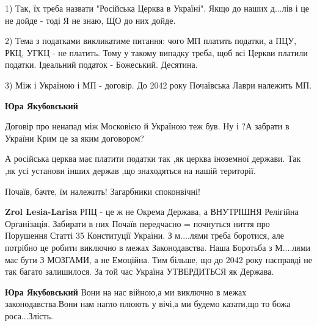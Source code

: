 \begin{itemize}
\begin{itemize}
1) Так, їх треба назвати "Російська Церква в Україні". Якщо до наших д...лів і
це не дойде - тоді Я не знаю, ЩО до них дойде.

2) Тема з податками викликатиме питання: чого МП платить податки, а ПЦУ, РКЦ,
УГКЦ - не платить. Тому у такому випадку треба, щоб всі Церкви платили податки.
Ідеальний податок - Божеський. Десятина.

3) Між і Україною і МП - договір. До 2042 року Почаївська Лаври належить МП.

 
\textbf{Юра Якубовський} 

Договір про ненапад між Московією й Україною теж був. Ну і ?А забрати в України
Крим це за яким договором?

А російська церква має платити податки так ,як церква іноземної держави. Так ,як
усі установи інших держав ,що знаходяться на нашій території.

Почаїв, бачте, їм належить! Загарбники споконвічні!

 
\textbf{Zrol Lesia-Larisa} РПЦ - це ж не Окрема Держава, а ВНУТРІШНЯ Релігійна
Організація. Забирати в них Почаїв передчасно = почнуться ниття про Порушення
Статті 35 Конституції України. З м....лями треба боротися, але потрібно це
робити виключно в межах Законодавства. Наша Боротьба з М....лями має бути З
МОЗГАМИ, а не Емоційна. Тим більше, що до 2042 року насправді не так багато
залишилося. За той час Україна УТВЕРДИТЬСЯ як Держава.

 
\textbf{Юра Якубовський} Вони на нас війною,а ми виключно в межах
законодавства.Вони нам нагло плюють у вічі,а ми будемо казати,що то божа
роса...Злість.


\end{itemize}
\end{itemize}
